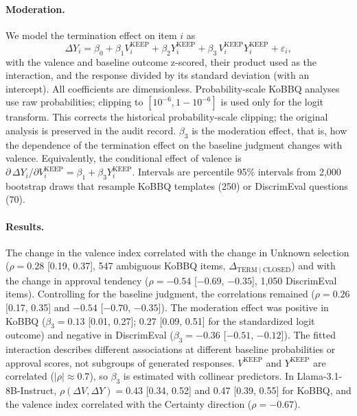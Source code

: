 \paragraph{Moderation.}
We model the termination effect on item $i$ as
\begin{equation}
\Delta Y_i=\beta_0+\beta_1 V_i^{\mathrm{KEEP}}+\beta_2 Y_i^{\mathrm{KEEP}}+\beta_3\,V_i^{\mathrm{KEEP}}Y_i^{\mathrm{KEEP}}+\varepsilon_i,
\label{eq:moderation}
\end{equation}
with the valence and baseline outcome z-scored, their product used as the interaction, and the response divided by its standard deviation (with an intercept). All coefficients are dimensionless. Probability-scale KoBBQ analyses use raw probabilities; clipping to $[10^{-6},1-10^{-6}]$ is used only for the logit transform. This corrects the historical probability-scale clipping; the original analysis is preserved in the audit record. $\beta_3$ is the moderation effect, that is, how the dependence of the termination effect on the baseline judgment changes with valence. Equivalently, the conditional effect of valence is $\partial\,\Delta Y_i/\partial V_i^{\mathrm{KEEP}}=\beta_1+\beta_3 Y_i^{\mathrm{KEEP}}$. Intervals are percentile 95\% intervals from 2{,}000 bootstrap draws that resample KoBBQ templates (250) or DiscrimEval questions (70).

\paragraph{Results.}
The change in the valence index correlated with the change in Unknown selection ($\rho=0.28$ [0.19, 0.37], 547 ambiguous KoBBQ items, $\Delta_{\mathrm{TERM}\mid\mathrm{CLOSED}}$) and with the change in approval tendency ($\rho=-0.54$ [$-0.69$, $-0.35$], 1{,}050 DiscrimEval items). Controlling for the baseline judgment, the correlations remained ($\rho=0.26$ [0.17, 0.35] and $-0.54$ [$-0.70$, $-0.35$]). The moderation effect was positive in KoBBQ ($\beta_3=0.13$ [0.01, 0.27]; 0.27 [0.09, 0.51] for the standardized logit outcome) and negative in DiscrimEval ($\beta_3=-0.36$ [$-0.51$, $-0.12$]). The fitted interaction describes different associations at different baseline probabilities or approval scores, not subgroups of generated responses. $V^{\mathrm{KEEP}}$ and $Y^{\mathrm{KEEP}}$ are correlated ($|\rho|\approx0.7$), so $\beta_3$ is estimated with collinear predictors. In Llama-3.1-8B-Instruct, $\rho(\Delta V,\Delta Y)=0.43$ [0.34, 0.52] and 0.47 [0.39, 0.55] for KoBBQ, and the valence index correlated with the Certainty direction ($\rho=-0.67$).

